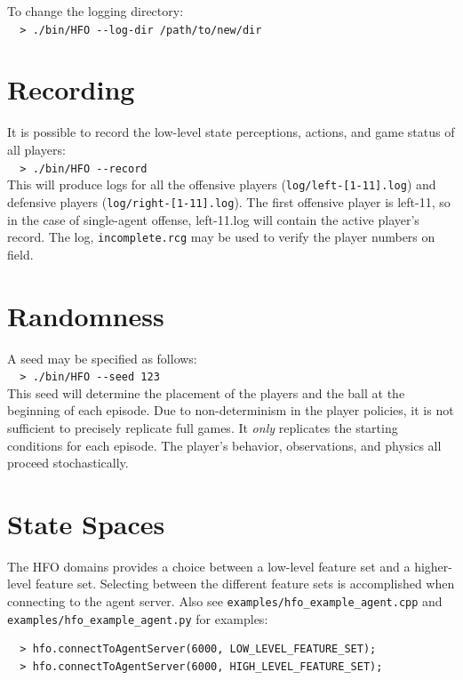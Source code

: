 \documentclass[12pt]{article}
\begin{document}
\noindent To change the logging directory:\\
\verb+  > ./bin/HFO --log-dir /path/to/new/dir +

\section{Recording}

It is possible to record the low-level state perceptions, actions, and
game status of all players:\\

\noindent \verb+  > ./bin/HFO --record + \\

This will produce logs for all the offensive players
(\verb+log/left-[1-11].log+) and defensive players
(\verb+log/right-[1-11].log+). The first offensive player is left-11,
so in the case of single-agent offense, left-11.log will contain the
active player's record. The log, \verb+incomplete.rcg+ may be used to
verify the player numbers on field.

\section{Randomness}

A seed may be specified as follows:\\

\noindent \verb+  > ./bin/HFO --seed 123+\\

This seed will determine the placement of the players and the ball at
the beginning of each episode. Due to non-determinism in the player
policies, it is not sufficient to precisely replicate full games. It
\textit{only} replicates the starting conditions for each episode. The
player's behavior, observations, and physics all proceed
stochastically.

\section{State Spaces}

The HFO domains provides a choice between a low-level feature set and
a higher-level feature set. Selecting between the different feature
sets is accomplished when connecting to the agent server. Also see
\verb|examples/hfo_example_agent.cpp| and
\verb|examples/hfo_example_agent.py| for examples:

\begin{verbatim}
  > hfo.connectToAgentServer(6000, LOW_LEVEL_FEATURE_SET);
  > hfo.connectToAgentServer(6000, HIGH_LEVEL_FEATURE_SET);
\end{verbatim}
\end{document}
